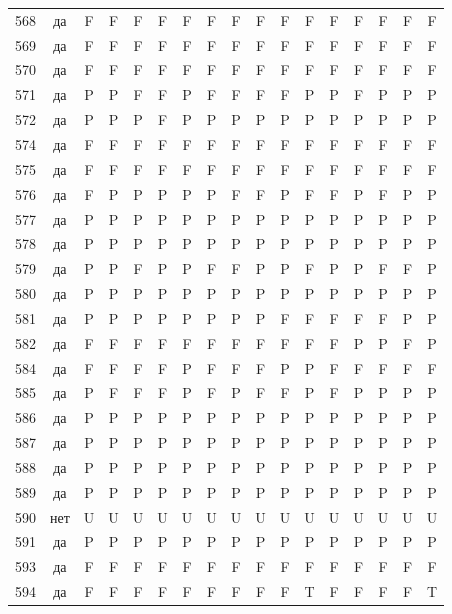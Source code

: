 \begin{table}[p]
\begin{tabular*}{\textwidth}{@{\extracolsep{\fill}}rcccccccccccccccc}
568 & да & F & F & F & F & F & F & F & F & F & F & F & F & F & F & F\\
569 & да & F & F & F & F & F & F & F & F & F & F & F & F & F & F & F\\
570 & да & F & F & F & F & F & F & F & F & F & F & F & F & F & F & F\\
571 & да & P & P & F & F & P & F & F & F & F & P & P & F & P & P & P\\
572 & да & P & P & P & F & P & P & P & P & P & P & P & P & P & P & P\\
574 & да & F & F & F & F & F & F & F & F & F & F & F & F & F & F & F\\
575 & да & F & F & F & F & F & F & F & F & F & F & F & F & F & F & F\\
576 & да & F & P & P & P & P & P & F & F & P & F & F & P & F & P & P\\
577 & да & P & P & P & P & P & P & P & P & P & P & P & P & P & P & P\\
578 & да & P & P & P & P & P & P & P & P & P & P & P & P & P & P & P\\
579 & да & P & P & F & P & P & F & F & P & P & F & P & P & F & F & P\\
580 & да & P & P & P & P & P & P & P & P & P & P & P & P & P & P & P\\
581 & да & P & P & P & P & P & P & P & P & F & F & F & F & F & P & P\\
582 & да & F & F & F & F & F & F & F & F & F & F & F & P & P & F & P\\
584 & да & F & F & F & F & P & F & F & F & P & P & F & F & F & F & F\\
585 & да & P & F & F & F & P & F & P & F & F & P & F & P & P & P & P\\
586 & да & P & P & P & P & P & P & P & P & P & P & P & P & P & P & P\\
587 & да & P & P & P & P & P & P & P & P & P & P & P & P & P & P & P\\
588 & да & P & P & P & P & P & P & P & P & P & P & P & P & P & P & P\\
589 & да & P & P & P & P & P & P & P & P & P & P & P & P & P & P & P\\
590 & нет & U & U & U & U & U & U & U & U & U & U & U & U & U & U & U\\
591 & да & P & P & P & P & P & P & P & P & P & P & P & P & P & P & P\\
593 & да & F & F & F & F & F & F & F & F & F & F & F & F & F & F & F\\
594 & да & F & F & F & F & F & F & F & F & F & T & F & F & F & F & T\\
\bottomrule\end{tabular*}\end{table}
\clearpage

